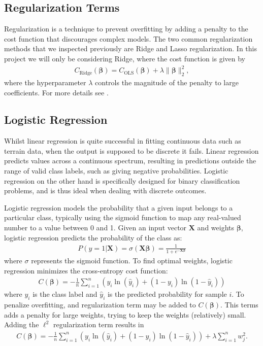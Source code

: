 \documentclass[%
reprint,
amsmath,amssymb,
aps,
]{revtex4-2}
\begin{document}
\subsection{Regularization Terms}
Regularization is a technique to prevent overfitting by adding a penalty to the cost function that discourages complex models. The two common regularization methods that we inspected previously are Ridge and Lasso regularization. In this project we will only be considering Ridge, where the cost function is given by
\begin{align}
	C_\text{Ridge}(\bm \beta) = C_\text{OLS}(\bm \beta) + \lambda \|\bm \beta\|_2^2,
\end{align}
where the hyperparameter $\lambda$ controls the magnitude of the penalty to large coefficients. For more details see \cite{project1}.

\subsection{Logistic Regression}
Whilst linear regression is quite successful in fitting continuous data such as terrain data, when the output is supposed to be discrete it fails. Linear regression predicts values across a continuous spectrum, resulting in predictions outside the range of valid class labels, such as giving negative probabilities. Logistic regression on the other hand is specifically designed for binary classification problems, and is thus ideal when dealing with discrete outcomes. 

Logistic regression models the probability that a given input belongs to a particular class, typically using the sigmoid function to map any real-valued number to a value between 0 and 1. Given an input vector $\bm X$ and weights $\bm\beta$, logistic regression predicts the probability of the class as:
\begin{align}
	P(y=1|\bm X)=\sigma(\bm X\bm\beta)=\frac{1}{1+e^{-\bm X\bm\beta}}
\end{align}
where $\sigma$ represents the sigmoid function. To find optimal weights, logistic regression minimizes the cross-entropy cost function:
\begin{align}
	C(\bm\beta)=-\frac1n\sum_{i=1}^n\left(y_i \ln(\hat y_i)+(1-y_i)\ln(1-\hat y_i) \right)
\end{align}
where $y_i$ is the class label and $\hat{y}_i$ is the predicted probability for sample $i$. To penalize overfitting, and regularization term may be added to \(C(\bm\beta)\). This terms adds a penalty for large weights, trying to keep the weights (relatively) small. Adding the \(\ell^2\) regularization term results in 
\begin{align}
	C(\bm\beta)=-\frac1n\sum_{i=1}^n\left(y_i \ln(\hat y_i)+(1-y_i)\ln(1-\hat y_i) \right) + \lambda\sum\limits_{i=1}^{n}w_{j}^{2}.
\end{align}
\end{document}
